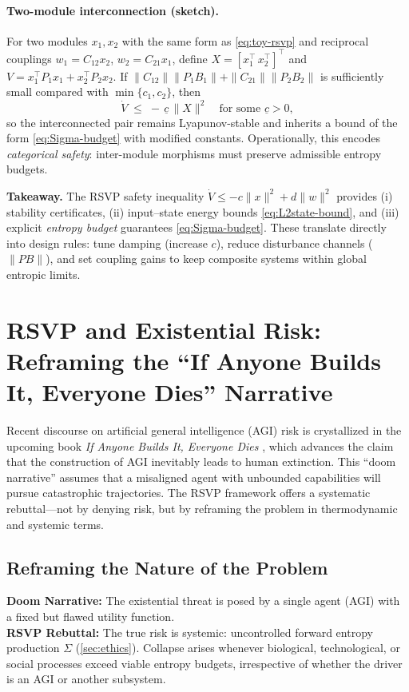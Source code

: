 \documentclass[12pt]{article}
\begin{document}
\paragraph{Two-module interconnection (sketch).}
For two modules $x_1,x_2$ with the same form as \eqref{eq:toy-rsvp} and reciprocal couplings $w_1=C_{12}x_2$, $w_2=C_{21}x_1$, define $X=[x_1^\top\,x_2^\top]^\top$ and $V= x_1^\top P_1 x_1 + x_2^\top P_2 x_2$. If
$\|C_{12}\|\|P_1 B_1\|+\|C_{21}\|\|P_2 B_2\|$ is sufficiently small compared with $\min\{c_1,c_2\}$, then
\[
\dot V \;\le\; -\,\underline{c}\,\|X\|^2
\quad \text{for some }\underline{c}>0,
\]
so the interconnected pair remains Lyapunov-stable and inherits a bound of the form \eqref{eq:Sigma-budget} with modified constants. Operationally, this encodes \emph{categorical safety}: inter-module morphisms must preserve admissible entropy budgets.

\medskip
\noindent
\textbf{Takeaway.} The RSVP safety inequality $\dot V\le -c\|x\|^2+d\|w\|^2$ provides (i) stability certificates, (ii) input–state energy bounds \eqref{eq:L2state-bound}, and (iii) explicit \emph{entropy budget} guarantees \eqref{eq:Sigma-budget}. These translate directly into design rules: tune damping (increase $c$), reduce disturbance channels ($\|PB\|$), and set coupling gains to keep composite systems within global entropic limits.

\section{RSVP and Existential Risk: Reframing the ``If Anyone Builds It, Everyone Dies'' Narrative}

Recent discourse on artificial general intelligence (AGI) risk is crystallized in the upcoming book \emph{If Anyone Builds It, Everyone Dies} \cite{YudkowskySoares2025}, which advances the claim that the construction of AGI inevitably leads to human extinction. This ``doom narrative'' assumes that a misaligned agent with unbounded capabilities will pursue catastrophic trajectories. The RSVP framework offers a systematic rebuttal—not by denying risk, but by reframing the problem in thermodynamic and systemic terms.

\subsection{Reframing the Nature of the Problem}
\textbf{Doom Narrative:} The existential threat is posed by a single agent (AGI) with a fixed but flawed utility function.\\
\textbf{RSVP Rebuttal:} The true risk is systemic: uncontrolled forward entropy production $\Sigma$ (\autoref{sec:ethics}). Collapse arises whenever biological, technological, or social processes exceed viable entropy budgets, irrespective of whether the driver is an AGI or another subsystem.
\end{document}
